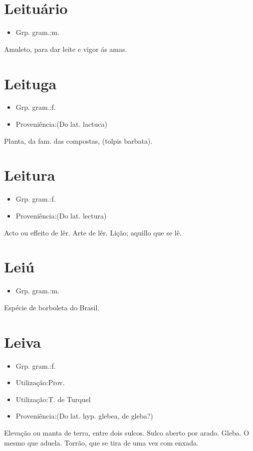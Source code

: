 \section{Leituário}
\begin{itemize}
\item {Grp. gram.:m.}
\end{itemize}
Amuleto, para dar leite e vigor ás amas.
\section{Leituga}
\begin{itemize}
\item {Grp. gram.:f.}
\end{itemize}
\begin{itemize}
\item {Proveniência:(Do lat. \textunderscore lactuca\textunderscore )}
\end{itemize}
Planta, da fam. das compostas, (\textunderscore tolpis barbata\textunderscore ).
\section{Leitura}
\begin{itemize}
\item {Grp. gram.:f.}
\end{itemize}
\begin{itemize}
\item {Proveniência:(Do lat. \textunderscore lectura\textunderscore )}
\end{itemize}
Acto ou effeito de lêr.
Arte de lêr.
Lição; aquillo que se lê.
\section{Leiú}
\begin{itemize}
\item {Grp. gram.:m.}
\end{itemize}
Espécie de borboleta do Brasil.
\section{Leiva}
\begin{itemize}
\item {Grp. gram.:f.}
\end{itemize}
\begin{itemize}
\item {Utilização:Prov.}
\end{itemize}
\begin{itemize}
\item {Utilização:T. de Turquel}
\end{itemize}
\begin{itemize}
\item {Proveniência:(Do lat. hyp. \textunderscore glebea\textunderscore , de \textunderscore gleba\textunderscore ?)}
\end{itemize}
Elevação ou manta de terra, entre dois sulcos.
Sulco aberto por arado.
Gleba.
O mesmo que \textunderscore aduela\textunderscore .
Torrão, que se tira de uma vez com enxada.
